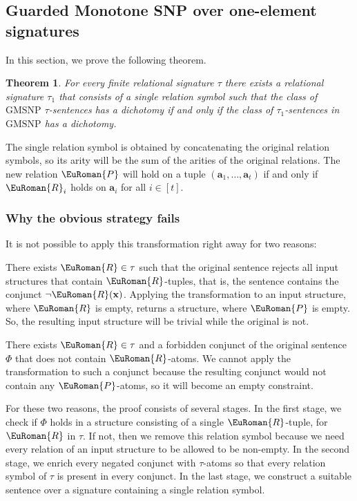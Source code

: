 \documentclass[10pt,a4paper]{amsart}
\theoremstyle{plain}
\newtheorem{thm}{Theorem}[section]
\theoremstyle{definition}
\numberwithin{equation}{section}
\newcommand{\eurm}[1]{\EuRoman{#1}} %
\newcommand{\tuple}[1]{\mathbf{#1}} %
\newcommand{\rel}[1]{\eurm{#1}} %
\newcommand{\GMSNP}[0]{\textrm{GMSNP}}
\begin{document}
\subsection{Guarded Monotone SNP over one-element signatures}\label{section:gmsnp}

In this section, we prove the following theorem.


\begin{thm}\label{th:gmsnp} 
For every finite relational signature $\tau$ there exists a relational signature $\tau_1$ that consists of a single relation symbol such that the class of $\GMSNP$ $\tau$-sentences has a dichotomy if and only if the class of $\tau_1$-sentences in $\GMSNP$ has a dichotomy.
\end{thm} 





The single relation symbol is obtained by concatenating the original relation symbols, so its arity will be the sum of the arities of the original relations.
The new relation $\rel{P}$ will hold on a tuple $(\tuple{a}_1,\ldots,\tuple{a}_t)$ if and only if $\rel{R}_i$ holds on $\tuple{a}_i$ for all $i\in[t]$.
\subsubsection*{Why the obvious strategy fails}
It is not possible to apply this transformation right away for two reasons:
\begin{compactenum}[(a)]
\item There exists $\rel{R}\in\tau$ such that the original sentence rejects all input structures that contain $\rel{R}$-tuples, that is, the sentence contains the conjunct $\neg\rel{R}(\tuple{x})$.
Applying the transformation to an input structure, where $\rel{R}$ is empty, returns a structure, where $\rel{P}$ is empty.
So, the resulting input structure will be trivial while the original is not.
\item There exists $\rel{R}\in\tau$ and a forbidden conjunct of the original sentence $\Phi$ that does not contain $\rel{R}$-atoms. 
We cannot apply the transformation to such a conjunct because the resulting conjunct would not contain any $\rel{P}$-atoms, so it will become an empty constraint.
\end{compactenum}
For these two reasons, the proof consists of several stages.
In the first stage, we check if $\Phi$ holds in a structure consisting of a
single $\rel{R}$-tuple, for $\rel{R}$ in $\tau$. If not, then we remove this relation symbol because we need every relation of an input structure to be allowed to be non-empty.
In the second stage, we enrich every negated conjunct with $\tau$-atoms so that every relation symbol of $\tau$ is present in every conjunct.
In the last stage, we construct a suitable sentence over a signature containing a single relation symbol.
\end{document}
